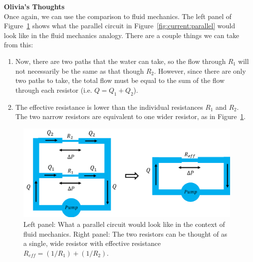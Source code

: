 \begin{framed}
\textbf{Olivia's Thoughts}\\
Once again, we can use the comparison to fluid mechanics. The left panel of Figure~\ref{fig:current:waterparallel} shows what the parallel circuit in Figure~\ref{fig:current:parallel} would look like in the fluid mechanics analogy. There are a couple things we can take from this:

\begin{enumerate}
\item Now, there are two paths that the water can take, so the flow through $R_1$ will not necessarily be the same as that though $R_2$. However, since there are only two paths to take, the total flow must be equal to the sum of the flow through each resistor (i.e. $Q=Q_1+Q_2$).
\item The effective resistance is lower than the individual resistances $R_1$ and $R_2$. The two narrow resistors are equivalent to one wider resistor, as in Figure~\ref{fig:current:waterparallel}.
\end{enumerate}

\begin{figure}[!htbp]
\centering
\includegraphics[width=0.7\linewidth]{files/waterparallel-185622bb6a9f5dca18b789894c44d66f.png}
\caption[]{Left panel: What a parallel circuit would look like in the context of fluid mechanics. Right panel: The two resistors can be thought of as a single, wide resistor with effective resistance $R_{eff}=(1/R_1)+(1/R_2)$.}
\label{fig:current:waterparallel}
\end{figure}
\end{framed}

